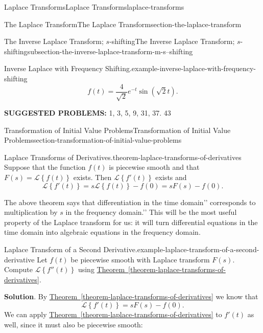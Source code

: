 \documentclass[oneside,10pt,]{book}
\newcommand{\terminology}[1]{\textbf{#1}}
\numberwithin{equation}{section}
\newcommand{\Laplace}[1]{\mathcal{L}\left\{#1\right\}}
\begin{document}
\begin{chapterptx}{Laplace Transforms}{}{Laplace Transforms}{}{}{laplace-transforms}
\begin{sectionptx}{The Laplace Transform}{}{The Laplace Transform}{}{}{section-the-laplace-transform}
\begin{subsectionptx}{The Inverse Laplace Transform; \(s\)-shifting}{}{The Inverse Laplace Transform; \(s\)-shifting}{}{}{subsection-the-inverse-laplace-transform-m-s--shifting}
\begin{example}{Inverse Laplace with Frequency Shifting.}{example-inverse-laplace-with-frequency-shifting}
\begin{equation*}
f(t) = \frac{4}{\sqrt{2}}e^{-t}\sin(\sqrt{2}t).
\end{equation*}
%
\end{example}
\terminology{SUGGESTED PROBLEMS:} 1, 3, 5, 9, 31, 37. 43\end{subsectionptx}
\end{sectionptx}
%
%
\typeout{************************************************}
\typeout{************************************************}
%
\begin{sectionptx}{Transformation of Initial Value Problems}{}{Transformation of Initial Value Problems}{}{}{section-transformation-of-initial-value-problems}
\begin{theorem}{Laplace Transforms of Derivatives.}{}{theorem-laplace-transforms-of-derivatives}%
\hypertarget{p-513}{}%
Suppose that the function \(f(t)\) is piecewise smooth and that \(F(s) = \Laplace{f(t)}\) exists. Then \(\Laplace{f'(t)}\) exists and%
\begin{equation*}
\Laplace{f'(t)} = s\Laplace{f(t)}-f(0) = sF(s)-f(0).
\end{equation*}
%
\end{theorem}
\hypertarget{p-514}{}%
The above theorem says that differentiation in the \textasciigrave{}\textasciigrave{}time domain'{}'{} corresponds to multiplication by \(s\) in the \textasciigrave{}\textasciigrave{}frequency domain.'{}'{} This will be the most useful property of the Laplace transform for us: it will turn differential equations in the time domain into algebraic equations in the frequency domain.%
\begin{example}{Laplace Transform of a Second Derivative.}{example-laplace-transform-of-a-second-derivative}%
\hypertarget{p-515}{}%
Let \(f(t)\) be piecewise smooth with Laplace transform \(F(s)\). Compute \(\Laplace{f''(t)}\) using \hyperref[theorem-laplace-transforms-of-derivatives]{Theorem~\ref{theorem-laplace-transforms-of-derivatives}}.%
\par\smallskip%
\noindent\textbf{Solution}.\hypertarget{solution-82}{}\quad%
\hypertarget{p-516}{}%
By \hyperref[theorem-laplace-transforms-of-derivatives]{Theorem~\ref{theorem-laplace-transforms-of-derivatives}} we know that%
\begin{equation*}
\Laplace{f'(t)} = sF(s)-f(0).
\end{equation*}
We can apply \hyperref[theorem-laplace-transforms-of-derivatives]{Theorem~\ref{theorem-laplace-transforms-of-derivatives}} to \(f'(t)\) as well, since it must also be piecewise smooth:%

\end{example}
\end{sectionptx}
\end{chapterptx}
\end{document}

